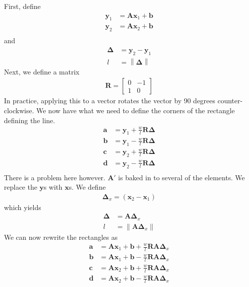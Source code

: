 \documentclass[11pt,a4paper]{article}
\newcommand{\norm}[1]{\left\lVert#1\right\rVert}
\newcommand{\p}[1]{\left(#1\right)}
\begin{document}
First, define
%
\begin{align}
  \mathbf{y}_1 &= \mathbf{A} \mathbf{x}_1 + \mathbf{b} \\
  \mathbf{y}_2 &= \mathbf{A} \mathbf{x}_2 + \mathbf{b} \\
\end{align}
%
and
%
\begin{align}
  \bm{\Delta} &= \mathbf{y}_2 - \mathbf{y}_1\\
  l &= \norm{\bm{\Delta}}
\end{align}
%
Next, we define a matrix
%
\begin{align}
  \mathbf{R} = \begin{bmatrix} 0 & -1 \\ 1 & 0 \end{bmatrix}
\end{align}
% 
In practice, applying this to a vector rotates the vector by 90 degrees
counter-clockwise. We now have what we need to define the corners
of the rectangle defining the line.
%
\begin{align}
  \mathbf{a} &= \mathbf{y}_1 + \frac{w}{l} \mathbf{R} \bm{\Delta}\\
  \mathbf{b} &= \mathbf{y}_1 - \frac{w}{l} \mathbf{R} \bm{\Delta}\\
  \mathbf{c} &= \mathbf{y}_2 + \frac{w}{l} \mathbf{R} \bm{\Delta}\\
  \mathbf{d} &= \mathbf{y}_2 - \frac{w}{l} \mathbf{R} \bm{\Delta}\\
\end{align}
%
There is a problem here however. $\mathbf{A}'$ is baked in to several
of the elements. We replace the $\mathbf{y}$s with $\mathbf{x}$s. We
define
%
\begin{align}
  \bm{\Delta}_x = \p{\mathbf{x}_2 - \mathbf{x}_1}
\end{align}
%
which yields
%
\begin{align}
  \bm{\Delta} &= \mathbf{A} \bm{\Delta}_x\\
  l &= \norm{\mathbf{A} \bm{\Delta}_x}
\end{align}
%
We can now rewrite the rectangles as
%
\begin{align}
  \mathbf{a} &= \mathbf{A} \mathbf{x}_1 + \mathbf{b} +
               \frac{w}{l} \mathbf{R} \mathbf{A} \bm{\Delta}_x\\
  \mathbf{b} &= \mathbf{A} \mathbf{x}_1 + \mathbf{b} -
               \frac{w}{l} \mathbf{R} \mathbf{A} \bm{\Delta}_x\\
  \mathbf{c} &= \mathbf{A} \mathbf{x}_2 + \mathbf{b} +
               \frac{w}{l} \mathbf{R} \mathbf{A} \bm{\Delta}_x\\
  \mathbf{d} &= \mathbf{A} \mathbf{x}_2 + \mathbf{b} -
               \frac{w}{l} \mathbf{R} \mathbf{A} \bm{\Delta}_x\\
\end{align}
\end{document}

